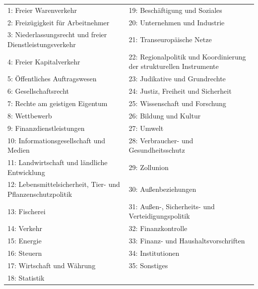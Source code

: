 \begin{tabular}{|p{7cm}|p{7cm}|}\hline

 1: Freier Warenverkehr &19: Beschäftigung und Soziales\\
 2: Freizügigkeit für Arbeitnehmer &20: Unternehmen und Industrie\\
 3: Niederlassungsrecht und freier Dienstleistungsverkehr &21: Transeuropäische Netze\\
 4: Freier Kapitalverkehr &22: Regionalpolitik und Koordinierung der strukturellen Instrumente\\
 5: Öffentliches Auftragswesen &23: Judikative und Grundrechte\\
 6: Gesellschaftsrecht &24: Justiz, Freiheit und Sicherheit\\
 7: Rechte am geistigen Eigentum &25: Wissenschaft und Forschung\\
 8: Wettbewerb &26: Bildung und Kultur\\
 9: Finanzdienstleistungen &27: Umwelt\\
10: Informationsgesellschaft und Medien &28: Verbraucher- und Gesundheitsschutz\\
11: Landwirtschaft und ländliche Entwicklung &29: Zollunion\\
12: Lebensmittelsicherheit, Tier- und Pflanzenschutzpolitik &30: Außenbeziehungen\\
13: Fischerei &31: Außen-, Sicherheits- und Verteidigungspolitik\\
14: Verkehr &32: Finanzkontrolle\\
15: Energie &33: Finanz- und Haushaltsvorschriften\\
16: Steuern &34: Institutionen\\
17: Wirtschaft und Währung &35: Sonstiges \\
18: Statistik&\\\hline
\end{tabular}\par

